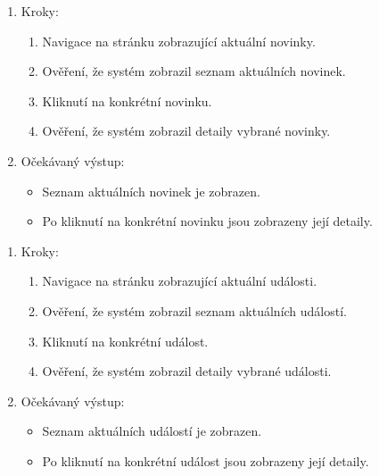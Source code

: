 \begin{enumerate}
  \item Kroky:
    \begin{enumerate}
      \item Navigace na stránku zobrazující aktuální novinky.
      \item Ověření, že systém zobrazil seznam aktuálních novinek.
      \item Kliknutí na konkrétní novinku.
      \item Ověření, že systém zobrazil detaily vybrané novinky.
    \end{enumerate}
  \item Očekávaný výstup:
    \begin{itemize}
      \item Seznam aktuálních novinek je zobrazen.
      \item Po kliknutí na konkrétní novinku jsou zobrazeny její detaily.
    \end{itemize}
\end{enumerate}


\begin{enumerate}
  \item Kroky:
    \begin{enumerate}
      \item Navigace na stránku zobrazující aktuální události.
      \item Ověření, že systém zobrazil seznam aktuálních událostí.
      \item Kliknutí na konkrétní událost.
      \item Ověření, že systém zobrazil detaily vybrané události.
    \end{enumerate}
  \item Očekávaný výstup:
    \begin{itemize}
      \item Seznam aktuálních událostí je zobrazen.
      \item Po kliknutí na konkrétní událost jsou zobrazeny její detaily.
    \end{itemize}
\end{enumerate}



